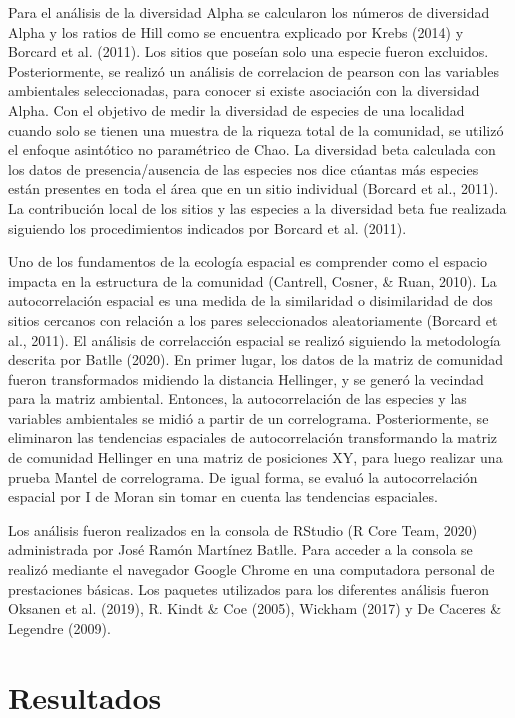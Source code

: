 \documentclass[11pt,]{article}
\begin{document}
Para el análisis de la diversidad Alpha se calcularon los números de
diversidad Alpha y los ratios de Hill como se encuentra explicado por
Krebs (2014) y Borcard et al. (2011). Los sitios que poseían solo una
especie fueron excluidos. Posteriormente, se realizó un análisis de
correlacion de pearson con las variables ambientales seleccionadas, para
conocer si existe asociación con la diversidad Alpha. Con el objetivo de
medir la diversidad de especies de una localidad cuando solo se tienen
una muestra de la riqueza total de la comunidad, se utilizó el enfoque
asintótico no paramétrico de Chao. La diversidad beta calculada con los
datos de presencia/ausencia de las especies nos dice cúantas más
especies están presentes en toda el área que en un sitio individual
(Borcard et al., 2011). La contribución local de los sitios y las
especies a la diversidad beta fue realizada siguiendo los procedimientos
indicados por Borcard et al. (2011).

Uno de los fundamentos de la ecología espacial es comprender como el
espacio impacta en la estructura de la comunidad (Cantrell, Cosner, \&
Ruan, 2010). La autocorrelación espacial es una medida de la similaridad
o disimilaridad de dos sitios cercanos con relación a los pares
seleccionados aleatoriamente (Borcard et al., 2011). El análisis de
correlacción espacial se realizó siguiendo la metodología descrita por
Batlle (2020). En primer lugar, los datos de la matriz de comunidad
fueron transformados midiendo la distancia Hellinger, y se generó la
vecindad para la matriz ambiental. Entonces, la autocorrelación de las
especies y las variables ambientales se midió a partir de un
correlograma. Posteriormente, se eliminaron las tendencias espaciales de
autocorrelación transformando la matriz de comunidad Hellinger en una
matriz de posiciones XY, para luego realizar una prueba Mantel de
correlograma. De igual forma, se evaluó la autocorrelación espacial por
I de Moran sin tomar en cuenta las tendencias espaciales.

Los análisis fueron realizados en la consola de RStudio (R Core Team,
2020) administrada por José Ramón Martínez Batlle. Para acceder a la
consola se realizó mediante el navegador Google Chrome en una
computadora personal de prestaciones básicas. Los paquetes utilizados
para los diferentes análisis fueron Oksanen et al. (2019), R. Kindt \&
Coe (2005), Wickham (2017) y De Caceres \& Legendre (2009).

\section{Resultados}\label{resultados}
\end{document}
